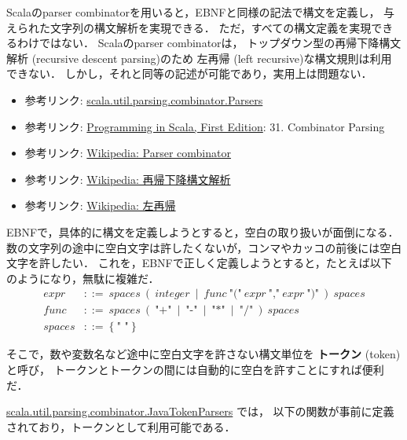 \documentclass[a4j]{jsarticle}
\begin{document}
Scalaのparser combinatorを用いると，EBNFと同様の記法で構文を定義し，
与えられた文字列の構文解析を実現できる．
ただ，すべての構文定義を実現できるわけではない．
Scalaのparser combinatorは，
トップダウン型の再帰下降構文解析 (recursive descent parsing)のため
左再帰 (left recursive)な構文規則は利用できない．
しかし，それと同等の記述が可能であり，実用上は問題ない．

\begin{itemize}
\item 参考リンク: \href{http://www.scala-lang.org/api/current/scala-parser-combinators/scala/util/parsing/combinator/Parsers.html}{scala.util.parsing.combinator.Parsers}
\item 参考リンク: \href{http://www.artima.com/pins1ed/}{Programming in Scala, First Edition}: 31. Combinator Parsing
\item 参考リンク: \href{https://en.wikipedia.org/wiki/Parser%255Fcombinator}{Wikipedia: Parser combinator}
\item 参考リンク: \href{https://ja.wikipedia.org/wiki/%E5%86%8D%E5%B8%B0%E4%B8%8B%E9%99%8D%E6%A7%8B%E6%96%87%E8%A7%A3%E6%9E%90}{Wikipedia: 再帰下降構文解析}
\item 参考リンク: \href{https://ja.wikipedia.org/wiki/%E5%B7%A6%E5%86%8D%E5%B8%B0}{Wikipedia: 左再帰}
\end{itemize}

EBNFで，具体的に構文を定義しようとすると，空白の取り扱いが面倒になる．
数の文字列の途中に空白文字は許したくないが，コンマやカッコの前後には空白文字を許したい．
これを，EBNFで正しく定義しようとすると，たとえば以下のようになり，無駄に複雑だ．
\begin{align*}
  \textit{expr} & ::=\ 
  \textit{spaces}\ (\ 
  \textit{integer}\ \mid\ 
  \textit{func}\ \mbox{"("}\ \textit{expr}\ \mbox{","}\ \textit{expr}\ \mbox{")"}\ 
  )\ \textit{spaces} \\
  \textit{func} & ::=\ 
  \textit{spaces}\ (\ 
  \mbox{"+"}\ \mid\ \mbox{"-"}\ \mid\ \mbox{"*"}\ \mid\ \mbox{"/"}\ 
  )\ \textit{spaces} \\
  \textit{spaces} & ::=\ 
  \{\ \mbox{" "}\ \}
\end{align*}

そこで，数や変数名など途中に空白文字を許さない構文単位を \textbf{トークン} (token)と呼び，
トークンとトークンの間には自動的に空白を許すことにすれば便利だ．

\href{http://www.scala-lang.org/api/current/scala-parser-combinators/scala/util/parsing/combinator/JavaTokenParsers.html}{scala.util.parsing.combinator.JavaTokenParsers} では，
以下の関数が事前に定義されており，トークンとして利用可能である．
\end{document}
